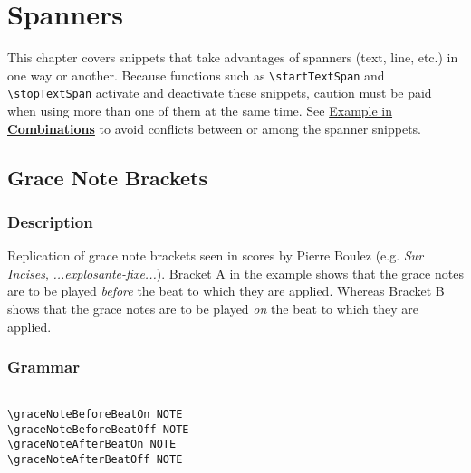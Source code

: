 

\chapter {Spanners}

This chapter covers snippets that take advantages of spanners (text, line, etc.) in one way or another. Because functions such as \verb|\startTextSpan| and \verb|\stopTextSpan| activate and deactivate these snippets, caution must be paid when using more than one of them at the same time. See \hyperref[sec:comb_spanners]{Example in \textbf{Combinations}} to avoid conflicts between or among the spanner snippets.

\section {Grace Note Brackets}
\hfill
{}
\hfill

\subsection{Description}

Replication of grace note brackets seen in scores by Pierre Boulez (e.g. \textit{Sur Incises}\autocite{RN1738}, \textit{...explosante-fixe...}\autocite{RN1737}). Bracket A in the example shows that the grace notes are to be played \textit{before} the beat to which they are applied. Whereas Bracket B shows that the grace notes are to be played \textit{on} the beat to which they are applied.

\subsection{Grammar}
\begin{verbatim}

\graceNoteBeforeBeatOn NOTE
\graceNoteBeforeBeatOff NOTE
\graceNoteAfterBeatOn NOTE
\graceNoteAfterBeatOff NOTE

\end{verbatim}

